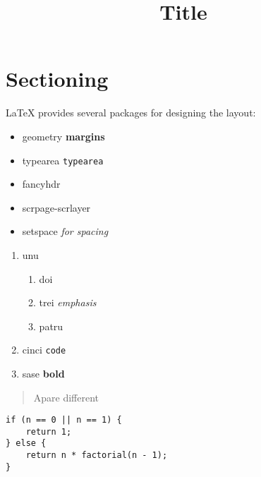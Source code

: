 \documentclass{article}
\begin{document}
\title{Title}\date{}
\section{Sectioning}\markdown
LaTeX provides several packages for designing the layout:
\begin{itemize}
  \item geometry \textbf{margins}
  \item typearea \texttt{typearea}
  \item fancyhdr 
  \item scrpage-scrlayer
  \item setspace \textit{for spacing}
\end{itemize}

\begin{enumerate}
	\item unu
		\begin{enumerate}
		\item doi
		\item trei \emph{emphasis}
		\item patru
	\end{enumerate}
	\item cinci \texttt{code}
	\item sase \textbf{bold}
\end{enumerate}
\begin{quotation}Apare different\end{quotation}
\begin{verbatim}
if (n == 0 || n == 1) {
	return 1;
} else {
	return n * factorial(n - 1);
}
\end{verbatim}
    \usepackage{hyperref}
\end{document}
